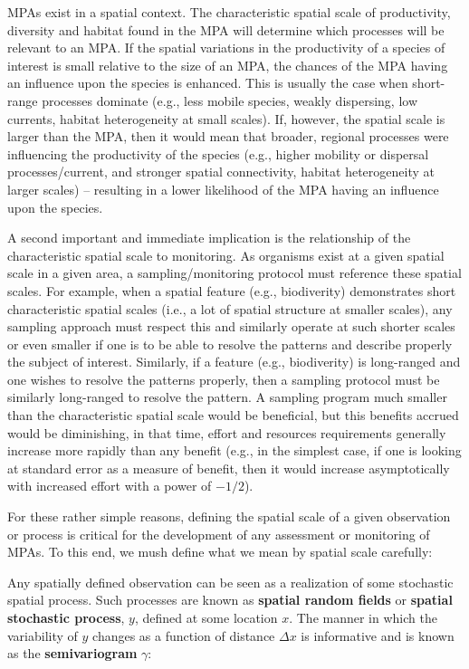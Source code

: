 \documentclass[letterpaper,portrait,11pt]{scrartcl}
\numberwithin{equation}{section}		%
\numberwithin{figure}{section}		%
\numberwithin{table}{section}				%
\begin{document}
MPAs exist in a spatial context. The characteristic spatial scale of productivity, diversity and habitat found in the MPA will determine which processes will be relevant to an MPA. If the spatial variations in the productivity of a species of interest is small relative to the size of an MPA, the chances of the MPA having an influence upon the species is enhanced. This is usually the case when short-range processes dominate (e.g., less mobile species, weakly dispersing, low currents, habitat heterogeneity at small scales). If, however, the spatial scale is larger than the MPA, then it would mean that broader, regional processes were influencing the productivity of the species (e.g., higher mobility or dispersal processes/current, and stronger spatial connectivity, habitat heterogeneity at larger scales) -- resulting in a lower likelihood of the MPA having an influence upon the species. 

A second important and immediate implication is the relationship of the characteristic spatial scale to monitoring. As organisms exist at a given spatial scale in a given area, a sampling/monitoring protocol must reference these spatial scales. For example, when a spatial feature (e.g., biodiverity) demonstrates short characteristic spatial scales (i.e., a lot of spatial structure at smaller scales), any sampling approach must respect this and similarly operate at such shorter scales or even smaller if one is to be able to resolve the patterns and describe properly the subject of interest. Similarly, if a feature (e.g., biodiverity) is long-ranged and one wishes to resolve the patterns properly, then a sampling protocol must be similarly long-ranged to resolve the pattern. A sampling program much smaller than the characteristic spatial scale would be beneficial, but this benefits accrued would be diminishing, in that time, effort and resources requirements generally increase more rapidly than any benefit (e.g., in the simplest case, if one is looking at standard error as a measure of benefit, then it would increase asymptotically with increased effort with a power of $-1/2$). 

For these rather simple reasons, defining the spatial scale of a given observation or process is critical for the development of any assessment or monitoring of MPAs. To this end, we mush define what we mean by spatial scale carefully:

Any spatially defined observation can be seen as a realization of some stochastic spatial process. Such  processes are known as \textbf{spatial random fields} or \textbf{spatial stochastic process}, $y$, defined at some location $x$. The manner in which the variability of $y$ changes as a function of distance $\Delta x$ is informative and is known as the \textbf{semivariogram} $\gamma$:
\end{document}
